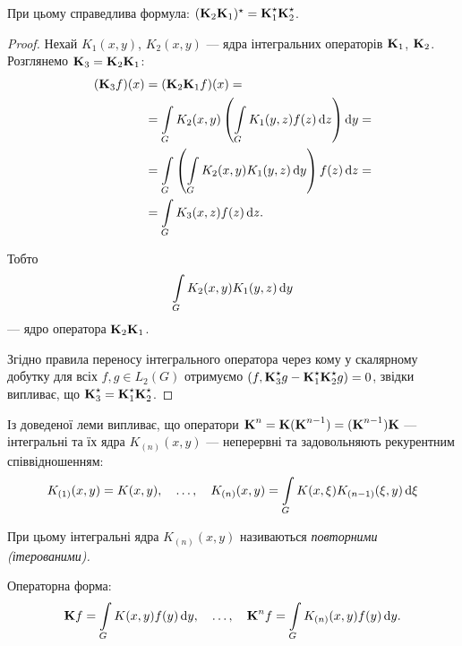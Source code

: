 \begin{remark}
	При цьому справедлива формула: $(\bf{K}_2 \bf{K}_1)^\star = \bf{K}_1^\star \bf{K}_2^\star$.
\end{remark}

\begin{proof}
	Нехай $K_1(x, y)$, $K_2(x, y)$ --- ядра інтегральних операторів $\bf{K}_1$, $\bf{K}_2$. Розглянемо $\bf{K}_3 = \bf{K}_2 \bf{K}_1$:
	\begin{equation}
		\begin{aligned}
			(\bf{K}_3 f)(x) &= (\bf{K}_2\bf{K}_1f)(x) = \\
			&= \Int_G K_2(x, y) \left( \Int_G K_1(y, z) f(z) \diff z \right) \diff y = \\
			&= \Int_G \left( \Int_G K_2(x, y) K_1(y, z) \diff y\right) f(z) \diff z = \\
			&= \Int_G K_3(x, z) f(z) \diff z.
		\end{aligned}
	\end{equation}
	
	Тобто
	\begin{equation}
		\Int_G K_2(x, y) K_1(y, z) \diff y
	\end{equation}
	--- ядро оператора $\bf{K}_2\bf{K}_1$. \medskip

	Згідно правила переносу інтегрального оператора через кому у скалярному добутку для всіх $f, g \in L_2(G)$ отримуємо $(f, \bf{K}_3^\star g - \bf{K}_1^\star  \bf{K}_2^\star  g) = 0$, звідки випливає, що $\bf{K}_3^\star  = \bf{K}_1^\star  \bf{K}_2^\star $.
\end{proof}

Із доведеної леми випливає, що оператори $\bf{K}^n = \bf{K} (\bf{K}^{n - 1}) = (\bf{K}^{n - 1})\bf{K}$ --- інтегральні та їх ядра $K_{(n)}(x, y)$ --- неперервні та задовольняють рекурентним співвідношенням:
\begin{equation}
	K_{(1)}(x, y) = K(x, y), \quad \ldots, \quad K_{(n)}(x, y) = \Int_G K(x, \xi) K_{(n - 1)}(\xi, y) \diff \xi
\end{equation}

\begin{definition}
	При цьому інтегра\-льні ядра $K_{(n)}(x, y)$ називаються \it{повторними (ітерованими)}.
\end{definition}

\begin{remark}
    Операторна форма:
    \begin{equation}
        \bf{K}f = \Int_G K(x, y) f(y) \diff y, \quad \ldots, \quad \bf{K}^n f = \Int_G K_{(n)}(x, y)f(y) \diff y.
    \end{equation}
\end{remark}

